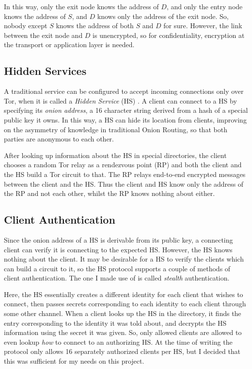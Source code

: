\documentclass[diss.tex]{subfiles}
\begin{document}
In this way, only the exit node knows the address of $D$, and only the entry node knows the address of $S$, and $D$ knows only the address of the exit node. So, nobody except $S$ knows the address of both $S$ and $D$ for sure. However, the link between the exit node and $D$ is unencrypted, so for confidentiality, encryption at the transport or application layer is needed.
\subsection{Hidden Services}
A traditional service can be configured to accept incoming connections only over Tor, when it is called a \textit{Hidden Service} (HS) \cite{torrendspec}. A client can connect to a HS by specifying its \textit{onion address}, a 16 character string derived from a hash of a special public key it owns. In this way, a HS can hide its location from clients, improving on the asymmetry of knowledge in traditional Onion Routing, so that both parties are anonymous to each other. 

After looking up information about the HS in special directories, the client chooses a random Tor relay as a rendezvous point (RP) and both the client and the HS build a Tor circuit to that. The RP relays end-to-end encrypted messages between the client and the HS. Thus the client and HS know only the address of the RP and not each other, whilst the RP knows nothing about either.

\subsection{Client Authentication}

Since the onion address of a HS is derivable from its public key, a connecting client can verify it is connecting to the expected HS. However, the HS knows nothing about the client. It may be desirable for a HS to verify the clients which can build a circuit to it, so the HS protocol supports a couple of methods of client authentication. The one I made use of is called \textit{stealth} authentication.

Here, the HS essentially creates a different identity for each client that wishes to connect, then passes secrets corresponding to each identity to each client through some other channel. When a client looks up the HS in the directory, it finds the entry corresponding to the identity it was told about, and decrypts the HS information using the secret it was given. So, only allowed clients are allowed to even lookup \textit{how} to connect to an authorizing HS. At the time of writing the protocol only allows 16 separately authorized clients per HS, but I decided that this was sufficient for my needs on this project.
\end{document}
